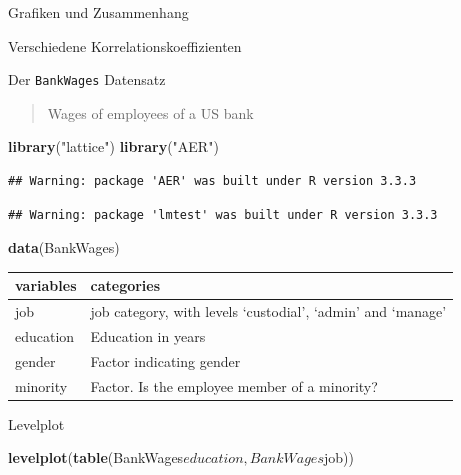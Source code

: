 \documentclass[ignorenonframetext,]{beamer}
\newenvironment{Shaded}{}{}
\newcommand{\KeywordTok}[1]{\textcolor[rgb]{0.00,0.44,0.13}{\textbf{{#1}}}}
\newcommand{\StringTok}[1]{\textcolor[rgb]{0.25,0.44,0.63}{{#1}}}
\newcommand{\NormalTok}[1]{{#1}}
\begin{document}
\begin{frame}[fragile]{Grafiken und Zusammenhang}
\begin{block}{Verschiedene Korrelationskoeffizienten}
\end{block}

\begin{block}{Der \texttt{BankWages} Datensatz}

\begin{quote}
Wages of employees of a US bank
\end{quote}

\begin{Shaded}
\begin{Highlighting}[]
\KeywordTok{library}\NormalTok{(}\StringTok{"lattice"}\NormalTok{)}
\KeywordTok{library}\NormalTok{(}\StringTok{"AER"}\NormalTok{)}
\end{Highlighting}
\end{Shaded}

\begin{verbatim}
## Warning: package 'AER' was built under R version 3.3.3
\end{verbatim}

\begin{verbatim}
## Warning: package 'lmtest' was built under R version 3.3.3
\end{verbatim}

\begin{Shaded}
\begin{Highlighting}[]
\KeywordTok{data}\NormalTok{(BankWages)}
\end{Highlighting}
\end{Shaded}

\begin{longtable}[]{@{}ll@{}}
\toprule
variables & categories\tabularnewline
\midrule
\endhead
job & job category, with levels `custodial', `admin' and
`manage'\tabularnewline
education & Education in years\tabularnewline
gender & Factor indicating gender\tabularnewline
minority & Factor. Is the employee member of a minority?\tabularnewline
\bottomrule
\end{longtable}

\end{block}

\begin{block}{Levelplot}

\begin{Shaded}
\begin{Highlighting}[]
\KeywordTok{levelplot}\NormalTok{(}\KeywordTok{table}\NormalTok{(BankWages$education,BankWages$job))}
\end{Highlighting}
\end{Shaded}


\end{block}
\end{frame}
\end{document}
